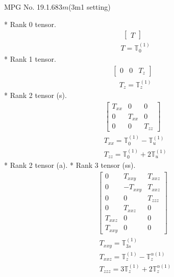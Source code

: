 \documentclass[fleqn,8pt,landscape]{jsarticle}
\begin{document}
\setcounter{MaxMatrixCols}{32}

\renewcommand{\tablename}{Table~}
\renewcommand{\figurename}{Figure~}
\begin{center}
\LARGE
MPG No. 19.1.68\quad$3m$\quad(3m1 setting)
\end{center}
* Rank 0 tensor.
\begin{align*}
\begin{bmatrix} T \end{bmatrix}
\end{align*}
\begin{align*}
& T = \mathbb{T}_{0}^{(1)}
\end{align*}
* Rank 1 tensor.
\begin{align*}
\begin{bmatrix} 0 & 0 & T_{z} \end{bmatrix}
\end{align*}
\begin{align*}
& T_{z} = \mathbb{T}_{z}^{(1)}
\end{align*}
* Rank 2 tensor (s).
\begin{align*}
\begin{bmatrix} T_{xx} & 0 & 0 \\ 0 & T_{xx} & 0 \\ 0 & 0 & T_{zz} \end{bmatrix}
\end{align*}
\begin{align*}
& T_{xx} = \mathbb{T}_{0}^{(1)} - \mathbb{T}_{u}^{(1)} \\
& T_{zz} = \mathbb{T}_{0}^{(1)} + 2 \mathbb{T}_{u}^{(1)}
\end{align*}
* Rank 2 tensor (a).
* Rank 3 tensor (ss).
\begin{align*}
\begin{bmatrix} 0 & T_{xxy} & T_{xxz} \\ 0 & - T_{xxy} & T_{xxz} \\ 0 & 0 & T_{zzz} \\ 0 & T_{xxz} & 0 \\ T_{xxz} & 0 & 0 \\ T_{xxy} & 0 & 0 \end{bmatrix}
\end{align*}
\begin{align*}
& T_{xxy} = \mathbb{T}_{3s}^{(1)} \\
& T_{xxz} = \mathbb{T}_{z}^{(1)} - \mathbb{T}_{z}^{\alpha(1)} \\
& T_{zzz} = 3 \mathbb{T}_{z}^{(1)} + 2 \mathbb{T}_{z}^{\alpha(1)}
\end{align*}
\end{document}

